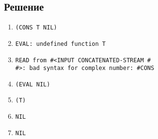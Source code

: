 \subsection*{Решение}
\begin{enumerate}
	\item \texttt{(CONS T NIL)}
	\item \texttt{EVAL: undefined function T}
	\item \texttt{READ from \#<INPUT CONCATENATED-STREAM \#<INPUT STRING-INPUT-STREAM>  \\ \#<IO TERMINAL-STREAM>>: bad syntax for complex number: \#CONS}
	\item \texttt{(EVAL NIL)}
	\item \texttt{(T)}
	\item \texttt{NIL}
	\item \texttt{NIL}
\end{enumerate}


\newpage
